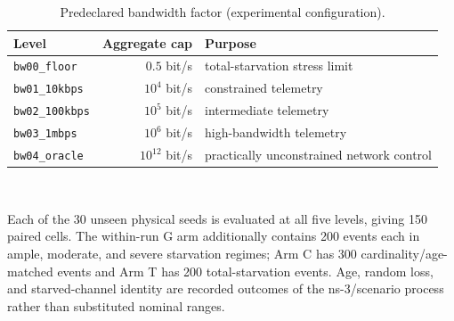 \documentclass[journal]{IEEEtran}
\theoremstyle{plain}
\theoremstyle{definition}
\theoremstyle{remark}
\begin{document}
\begin{table}[!t]
\caption{Predeclared bandwidth factor (experimental configuration).}
\label{tab:regimes}
\centering
\footnotesize
\renewcommand{\arraystretch}{1.2}
\begin{tabular}{@{}l r p{3.6cm}@{}}
\toprule
Level & Aggregate cap & Purpose \\
\midrule
\texttt{bw00\_floor} & $0.5$ bit/s & total-starvation stress limit \\
\texttt{bw01\_10kbps} & $10^{4}$ bit/s & constrained telemetry \\
\texttt{bw02\_100kbps} & $10^{5}$ bit/s & intermediate telemetry \\
\texttt{bw03\_1mbps} & $10^{6}$ bit/s & high-bandwidth telemetry \\
\texttt{bw04\_oracle} & $10^{12}$ bit/s & practically unconstrained network control \\
\bottomrule
\end{tabular}
\\[2pt]
\begin{minipage}{0.98\columnwidth}
\footnotesize
Each of the 30 unseen physical seeds is evaluated at all five levels,
giving 150 paired cells. The within-run G arm additionally contains 200
events each in ample, moderate, and severe starvation regimes; Arm C has
300 cardinality/age-matched events and Arm T has 200 total-starvation
events. Age, random loss, and starved-channel identity are recorded
outcomes of the ns-3/scenario process rather than substituted nominal
ranges.
\end{minipage}
\end{table}
\end{document}
